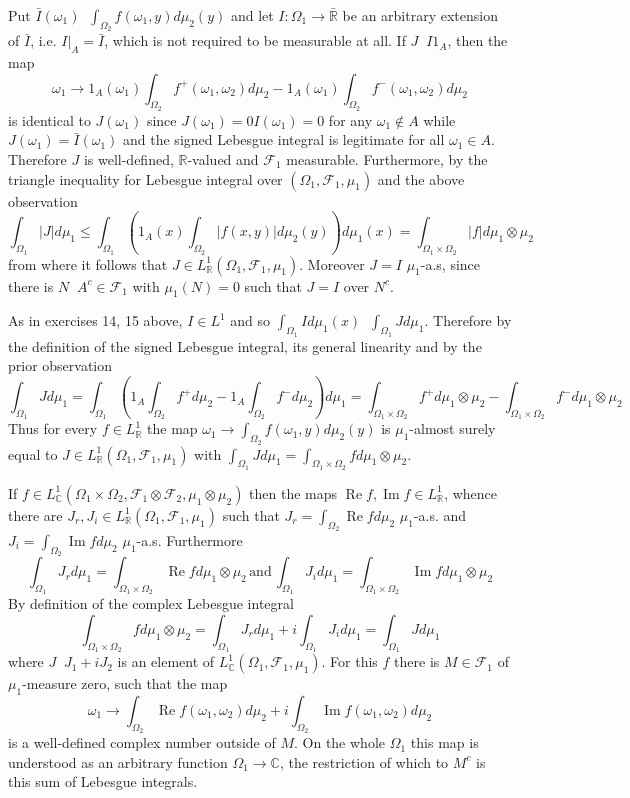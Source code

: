\documentclass[a4paper]{article}
\newcommand{\brac}[1]{\left ( #1 \right )}
\newcommand{\induc}[1]{\left . #1 \right \vert}
\newcommand{\abs}[1]{\left | #1 \right |}
\newcommand{\Rbar}{{\bar{\mathbb{R}}}}
\newcommand{\Real}{\mathbb{R}}
\newcommand{\Cplx}{\mathbb{C}}
\newcommand{\Fcal}{\mathcal{F}}
\newcommand{\defn}{\mathop{\overset{\Delta}{=}}\nolimits}
\newcommand{\re}{\operatorname{Re}\nolimits}
\newcommand{\im}{\operatorname{Im}\nolimits}
\begin{document}
Put $\bar{I}\brac{\omega_1} \defn \int_{\Omega_2} f\brac{\omega_1, y} d\mu_2\brac{y}$ and let $I:\Omega_1\to\Rbar$ be an arbitrary extension of $\bar{I}$, i.e. $\induc{I}_A = \bar{I}$, which is not required to be measurable at all. If $J\defn I 1_A$, then the map \[\omega_1\to 1_A\brac{\omega_1} \int_{\Omega_2} f^+\brac{\omega_1, \omega_2} d\mu_2 - 1_A\brac{\omega_1} \int_{\Omega_2} f^-\brac{\omega_1, \omega_2} d\mu_2 \] is identical to $J\brac{\omega_1}$ since $J\brac{\omega_1} = 0 I\brac{\omega_1} = 0$ for any $\omega_1\notin A$ while $J\brac{\omega_1} = \bar{I}\brac{\omega_1}$ and the signed Lebesgue integral is legitimate for all $\omega_1\in A$. Therefore $J$ is well-defined, $\Real$-valued and $\Fcal_1$ measurable. Furthermore, by the triangle inequality for Lebesgue integral over $\brac{\Omega_1, \Fcal_1, \mu_1}$ and the above observation \[\int_{\Omega_1} \abs{J} d\mu_1 \leq \int_{\Omega_1} \brac{ 1_A\brac{x} \int_{\Omega_2} \abs{f\brac{x, y}} d\mu_2\brac{y} } d\mu_1\brac{x} = \int_{\Omega_1\times\Omega_2} \abs{f} d\mu_1\otimes\mu_2\] from where it follows that $J\in L^1_\Real\brac{\Omega_1, \Fcal_1, \mu_1}$. Moreover $J = I$ $\mu_1$-a.s, since there is $N \defn A^c\in \Fcal_1$ with $\mu_1\brac{N} = 0$ such that $J = I$ over $N^c$.

As in exercises 14, 15 above, $I\in L^1$ and so $\int_{\Omega_1} I d\mu_1\brac{x} \defn \int_{\Omega_1} J d\mu_1$. Therefore by the definition of the signed Lebesgue integral, its general linearity and by the prior observation \[\int_{\Omega_1} J d\mu_1 = \int_{\Omega_1} \brac{ 1_A\int_{\Omega_2} f^+ d\mu_2 - 1_A\int_{\Omega_2} f^- d\mu_2 } d\mu_1 = \int_{\Omega_1\times\Omega_2} f^+ d\mu_1\otimes\mu_2 - \int_{\Omega_1\times\Omega_2} f^- d\mu_1\otimes\mu_2\] Thus for every $f\in L^1_\Real$ the map $\omega_1\to \int_{\Omega_2} f\brac{\omega_1, y} d\mu_2\brac{y}$ is $\mu_1$-almost surely equal to $J\in L^1_\Real\brac{\Omega_1,\Fcal_1, \mu_1}$ with $\int_{\Omega_1} J d\mu_1 = \int_{\Omega_1\times\Omega_2} f d\mu_1\otimes\mu_2$.

If $f\in L^1_\Cplx\brac{\Omega_1\times\Omega_2, \Fcal_1\otimes\Fcal_2, \mu_1\otimes\mu_2}$ then the maps $\re{f}, \im{f} \in L^1_\Real$, whence there are $J_r, J_i\in L^1_\Real\brac{\Omega_1, \Fcal_1, \mu_1}$ such that $J_r = \int_{\Omega_2} \re{f} d\mu_2$ $\mu_1$-a.s. and $J_i = \int_{\Omega_2} \im{f} d\mu_2$ $\mu_1$-a.s. Furthermore \[\int_{\Omega_1} J_r d\mu_1 = \int_{\Omega_1\times\Omega_2} \re{f} d\mu_1\otimes\mu_2\,\text{and}\,\int_{\Omega_1} J_i d\mu_1 = \int_{\Omega_1\times\Omega_2} \im{f} d\mu_1\otimes\mu_2\] By definition of the complex Lebesgue integral \[\int_{\Omega_1\times\Omega_2} f d\mu_1\otimes\mu_2 = \int_{\Omega_1} J_r d\mu_1 + i \int_{\Omega_1} J_i d\mu_1 = \int_{\Omega_1} J d\mu_1 \] where $J\defn J_1 + i J_2$ is an element of $L^1_\Cplx\brac{\Omega_1,\Fcal_1, \mu_1}$. For this $f$ there is $M\in \Fcal_1$ of $\mu_1$-measure zero, such that the map \[\omega_1\to \int_{\Omega_2} \re{f}\brac{\omega_1, \omega_2} d\mu_2 + i \int_{\Omega_2} \im{f}\brac{\omega_1, \omega_2} d\mu_2 \] is a well-defined complex number outside of $M$. On the whole $\Omega_1$ this map is understood as an arbitrary function $\Omega_1\to \Cplx$, the restriction of which to $M^c$ is this sum of Lebesgue integrals.
\end{document}
